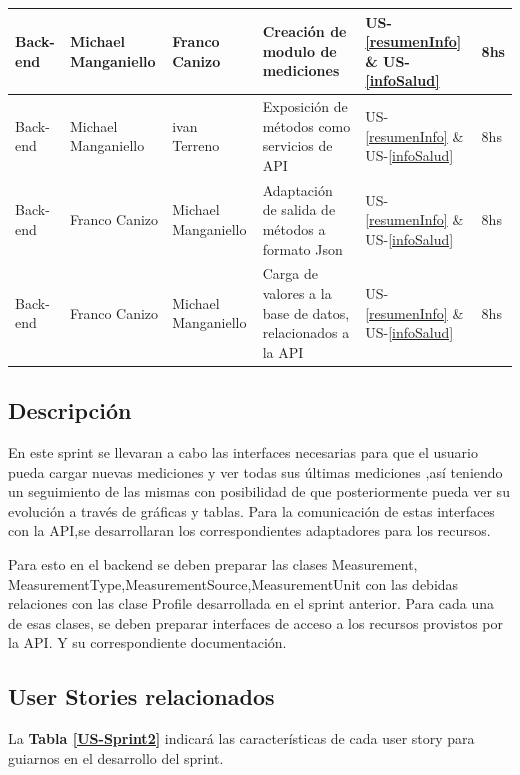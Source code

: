 \documentclass[a4paper,12pt]{article}
\begin{document}
{\begin{center}
{\begin{tabular}{|l|l|l|p{5cm}|l|p{1cm}|}
					Back-end& Michael Manganiello & Franco Canizo & Creación de modulo de mediciones&US-\ref{resumenInfo} \& US-\ref{infoSalud} &8hs\\ \hline
					Back-end& Michael Manganiello & ivan Terreno & Exposición de métodos como servicios de API 	& US-\ref{resumenInfo} \& US-\ref{infoSalud}&8hs\\ \hline
					Back-end& Franco Canizo & Michael Manganiello   & Adaptación de salida de métodos a formato Json&US-\ref{resumenInfo} \& US-\ref{infoSalud} &8hs\\ \hline
					Back-end & Franco Canizo & Michael Manganiello  & Carga de valores a la base de datos, relacionados a la API&US-\ref{resumenInfo} \& US-\ref{infoSalud} &8hs \\ \hline
				\end{tabular}
			}
		\end{center}
	}

    
\subsection{Descripción}
En este sprint se llevaran a cabo las interfaces necesarias para que el usuario pueda cargar nuevas mediciones y ver todas sus últimas mediciones ,así teniendo un seguimiento de las mismas con posibilidad de que posteriormente pueda ver su evolución a través de gráficas y tablas.
Para la comunicación de estas interfaces con la API,se desarrollaran los correspondientes adaptadores para los recursos.

Para esto en el backend se deben preparar las clases Measurement, MeasurementType,MeasurementSource,MeasurementUnit con las debidas relaciones con las clase Profile desarrollada en el sprint anterior.
Para cada una de esas clases, se deben preparar interfaces de acceso a los recursos provistos por la API. Y su correspondiente documentación.


\subsection{User Stories relacionados}
La \textbf{Tabla \ref{US-Sprint2}} indicará las características de cada user story para guiarnos en el desarrollo del sprint.
\end{document}
